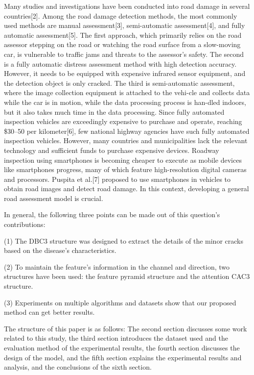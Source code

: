 \documentclass[sensors,article,submit,moreauthors]{Definitions/mdpi}
\begin{document}
    Many studies and investigations have been conducted into road damage in several countries[2]\citep{miller2009crash}. Among the road damage detection methods, the most commonly used methods are manual assessment[3]\citep{chatterjee2018fast}, semi-automatic assessment[4]\citep{shim2022road}, and fully automatic assessment[5]\citep{liang2022automatic}. The first approach, which primarily relies on the road assessor stepping on the road or watching the road surface from a slow-moving car, is vulnerable to traffic jams and threats to the assessor's safety. The second is a fully automatic distress assessment method with high detection accuracy. However, it needs to be equipped with expensive infrared sensor equipment, and the detection object is only cracked. The third is semi-automatic assessment, where the image collection equipment is attached to the vehi-cle and collects data while the car is in motion, while the data processing process is han-dled indoors, but it also takes much time in the data processing. Since fully automated inspection vehicles are exceedingly expensive to purchase and operate, reaching \$30--50 per kilometer[6]\citep{radopoulou2015detection}, few national highway agencies have such fully automated inspection vehicles. However, many countries and municipalities lack the relevant technology and sufficient funds to purchase expensive devices. Roadway inspection using smartphones is becoming cheaper to execute as mobile devices like smartphones progress, many of which feature high-resolution digital cameras and processors. Puspita et al.[7]\citep{puspita2022road} proposed to use smartphones in vehicles to obtain road images and detect road damage. In this context, developing a general road assessment model is crucial.

    In general, the following three points can be made out of this question's contributions:

    (1) The DBC3 structure was designed to extract the details of the minor cracks based on the disease's characteristics.

    (2) To maintain the feature's information in the channel and direction, two structures have been used: the feature pyramid structure and the attention CAC3 structure.

    (3) Experiments on multiple algorithms and datasets show that our proposed method can get better results.

    The structure of this paper is as follows: The second section discusses some work related to this study, the third section introduces the dataset used and the evaluation method of the experimental results, the fourth section discusses the design of the model, and the fifth section explains the experimental results and analysis, and the conclusions of the sixth section.
\end{document}
